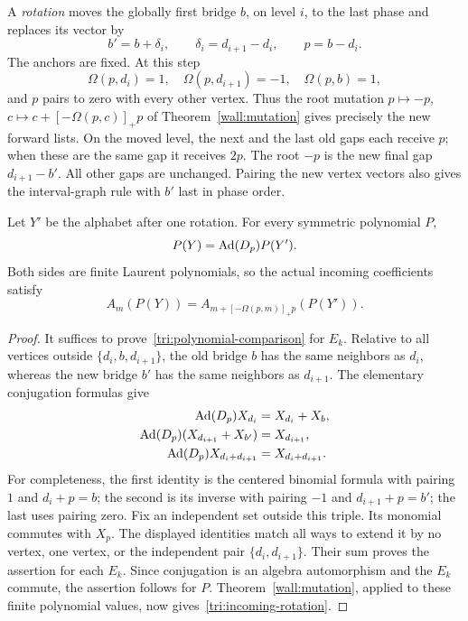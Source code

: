 A \emph{rotation} moves the globally first bridge $b$, on level $i$,
to the last phase and replaces its vector by
\begin{equation}\label{tri:rotation}
 b'=b+\delta_i,\qquad \delta_i=d_{i+1}-d_i,
 \qquad p=b-d_i.
\end{equation}
The anchors are fixed.  At this step
\[
 \Omega(p,d_i)=1,\quad \Omega(p,d_{i+1})=-1,\quad
 \Omega(p,b)=1,
\]
and $p$ pairs to zero with every other vertex.  Thus the root mutation
$p\mapsto-p$, $c\mapsto c+[-\Omega(p,c)]_+p$ of
Theorem~\ref{wall:mutation} gives precisely the new forward lists.
On the moved level, the next and the last old gaps each receive $p$;
when these are the same gap it receives $2p$.  The root $-p$ is the
new final gap $d_{i+1}-b'$.  All other gaps are unchanged.
Pairing the new vertex vectors also gives the interval-graph rule with
$b'$ last in phase order.

\begin{lemma}\label{tri:rotation-comparison}
Let $Y'$ be the alphabet after one rotation.  For every symmetric
polynomial $P$,
\begin{equation}\label{tri:polynomial-comparison}
 P(Y)=\operatorname{Ad}(D_p)P(Y').
\end{equation}
Both sides are finite Laurent polynomials, so the actual incoming
coefficients satisfy
\begin{equation}\label{tri:incoming-rotation}
 A_m(P(Y))=A_{m+[-\Omega(p,m)]_+p}(P(Y')).
\end{equation}
\end{lemma}

\begin{proof}
It suffices to prove~\eqref{tri:polynomial-comparison} for $E_k$.
Relative to all vertices outside $\{d_i,b,d_{i+1}\}$, the old bridge
$b$ has the same neighbors as $d_i$, whereas the new bridge $b'$ has
the same neighbors as $d_{i+1}$.  The elementary conjugation formulas
give
\begin{align*}
 \operatorname{Ad}(D_p)X_{d_i}&=X_{d_i}+X_b,\\
 \operatorname{Ad}(D_p)(X_{d_{i+1}}+X_{b'})&=X_{d_{i+1}},\\
 \operatorname{Ad}(D_p)X_{d_i+d_{i+1}}&=X_{d_i+d_{i+1}}.
\end{align*}
For completeness, the first identity is the centered binomial formula
with pairing $1$ and $d_i+p=b$; the second is its inverse with pairing
$-1$ and $d_{i+1}+p=b'$; the last uses pairing zero.
Fix an independent set outside this triple.  Its monomial commutes with
$X_p$.  The displayed identities match all ways to extend it by no
vertex, one vertex, or the independent pair $\{d_i,d_{i+1}\}$.
Their sum proves the assertion for each $E_k$.
Since conjugation is an algebra automorphism and the $E_k$ commute, the
assertion follows for $P$.  Theorem~\ref{wall:mutation}, applied to these
finite polynomial values, now gives~\eqref{tri:incoming-rotation}.
\end{proof}

